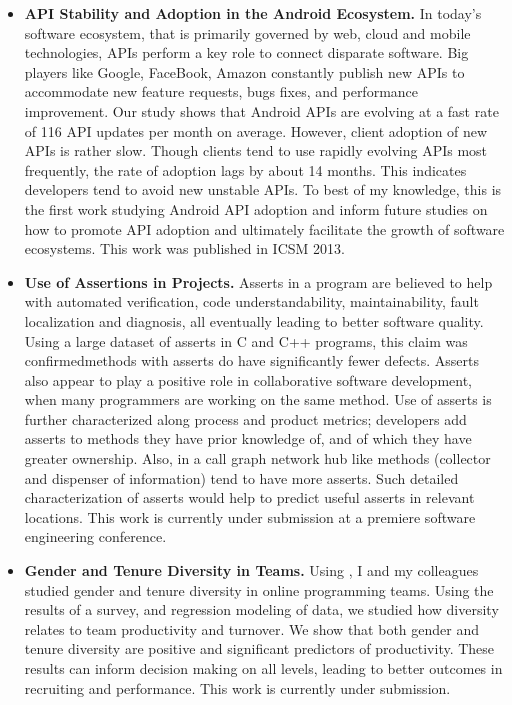 \documentclass[a4paper, 11pt]{article}
\begin{document}
\begin{small}
\begin{itemize}
  \item{\textbf{API Stability and Adoption in the Android Ecosystem.}}
    In today's software ecosystem, that is primarily governed by web, cloud and mobile
    technologies, APIs perform a key role to connect disparate software.  Big players like
    Google, FaceBook, Amazon constantly publish new APIs to accommodate new feature requests,
    bugs fixes, and performance improvement.  Our study shows that Android APIs are evolving at
    a fast rate of 116 API updates per month on average. However, client adoption of new APIs
    is rather slow.  Though clients tend to use rapidly evolving APIs most frequently, the rate
    of adoption lags by about 14 months.  This indicates developers tend to avoid new unstable
    APIs. To best of my knowledge, this is the first work studying Android API adoption and
    inform future studies on how to promote API adoption and ultimately facilitate the growth
    of software ecosystems. This work was published in ICSM 2013.

  
  \item{\textbf{Use of Assertions in \gh Projects.}}
     Asserts in a program are believed to help with automated verification, code
     understandability, maintainability, fault localization and diagnosis, all eventually
     leading to better software quality. Using a large dataset of asserts in C and C++
     programs, this claim was confirmed\textemdash methods with asserts do have significantly
     fewer defects. Asserts also appear to play a positive role in collaborative software
     development, when many programmers are working on the same method.  Use of asserts is
     further characterized along process and product metrics; developers add asserts to methods
     they have prior knowledge of, and of which they have greater ownership. Also, in a call
     graph network hub like methods (collector and dispenser of information) tend to have more
     asserts. Such detailed characterization of asserts would help to predict useful asserts in
     relevant locations.  This work is currently under submission at a premiere software
     engineering conference.

  \item{\textbf{Gender and Tenure Diversity in \gh Teams.}}
    Using \gh, I and my colleagues studied gender and tenure diversity in online programming teams.
    Using the results of a survey, and regression modeling of \gh data, we studied how diversity
    relates to team productivity and turnover. We show that both gender and tenure diversity are
    positive and significant predictors of productivity.  These results can inform decision making
    on all levels, leading to better outcomes in recruiting and performance.  This work is
    currently under submission.


\end{itemize}
\end{small}
\end{document}
